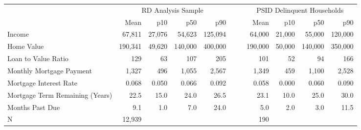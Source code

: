 \begin{tabular}{lrrrrllrrrr}
  \toprule
 \midrule
  & \multicolumn{4}{c}{RD Analysis Sample} & & &\multicolumn{4}{c}{PSID Delinquent Households}\\& Mean & p10 & p50 & p90 &&  & Mean & p10 & p50 & p90\\ \midrule
Income & 67,811 & 27,076 & 54,623 & 125,094 &  &  & 64,000 & 21,000 & 55,000 & 120,000 \\ 
  Home Value & 190,341 & 49,620 & 140,000 & 400,000 &  &  & 190,000 & 50,000 & 140,000 & 350,000 \\ 
  Loan to Value Ratio & 129 & 63 & 107 & 205 &  &  & 101 & 52 & 94 & 166 \\ 
  Monthly Mortgage Payment & 1,327 & 496 & 1,055 & 2,567 &  &  & 1,349 & 459 & 1,100 & 2,528 \\ 
  Mortgage Interest Rate & 0.068 & 0.050 & 0.066 & 0.092 &  &  & 0.058 & 0.000 & 0.060 & 0.090 \\ 
  Mortgage Term Remaining (Years) & 22.5 & 15.0 & 24.0 & 26.5 &  &  & 23.1 & 10.0 & 25.0 & 30.0 \\ 
  Months Past Due & 9.1 & 1.0 & 7.0 & 24.0 &  &  & 5.0 & 2.0 & 3.0 & 11.5 \\ 
   \midrule
N & 12,939 &  &  &  &  &  & 190 &  &  &  \\ 
   \midrule
 \bottomrule
\end{tabular}

